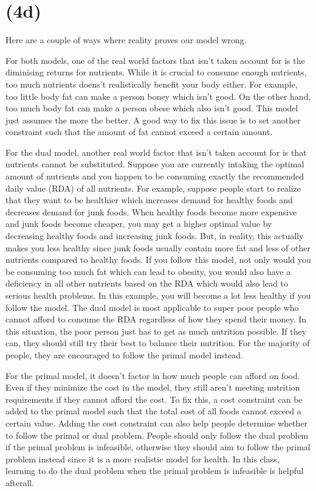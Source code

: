 \documentclass[17pt]{extarticle}
\begin{document}
\section*{(4d)}
Here are a couple of ways where reality proves our model wrong.

\bigskip For both models, one of the real world factors that isn't taken account for is the diminising returns for nutrients. While it is crucial to consume enough nutrients, too much nutrients doens't realistically benefit your body either. For example, too little body fat can make a person boney which isn't good. On the other hand, too much body fat can make a person obese which also isn't good. This model just assumes the more the better. A good way to fix this issue is to set another constraint such that the amount of fat cannot exceed a certain amount.

\bigskip For the dual model, another real world factor that isn't taken account for is that nutrients cannot be substituted. Suppose you are currently intaking the optimal amount of nutrients and you happen to be consuming exactly the recommended daily value (RDA) of all nutrients. For example, suppose people start to realize that they want to be healthier which increases demand for healthy foods and decreases demand for junk foods. When healthy foods become more expensive and junk foods become cheaper, you may get a higher optimal value by decreasing healthy foods and increasing junk foods. But, in reality, this actually makes you less healthy since junk foods usually contain more fat and less of other nutrients compared to healthy foods. If you follow this model, not only would you be consuming too much fat which can lead to obesity, you would also have a deficiency in all other nutrients based on the RDA which would also lead to serious health problems. In this example, you will become a lot less healthy if you follow the model. The dual model is most applicable to super poor people who cannot afford to consume the RDA regardless of how they spend their money. In this situation, the poor person just has to get as much nutrition possible. If they can, they should still try their best to balance their nutrition. For the majority of people, they are encouraged to follow the primal model instead.

\bigskip For the primal model, it doesn't factor in how much people can afford on food. Even if they minimize the cost in the model, they still aren't meeting nutrition requirements if they cannot afford the cost. To fix this, a cost constraint can be added to the primal model such that the total cost of all foods cannot exceed a certain value. Adding the cost constraint can also help people determine whether to follow the primal or dual problem.  People should only follow the dual problem if the primal problem is infeasible, otherwise they should aim to follow the primal problem instead since it is a more realistic model for health. In this class, learning to do the dual problem when the primal problem is infeasible is helpful afterall.
\end{document}
